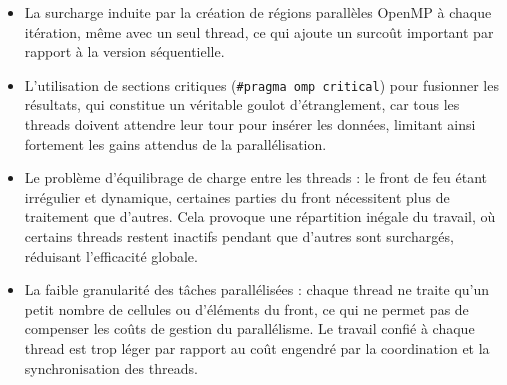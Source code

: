 \documentclass[a4paper,12pt]{article}
\begin{document}
\begin{itemize}
    \item La surcharge induite par la création de régions parallèles OpenMP à chaque itération, même avec un seul thread, ce qui ajoute un surcoût important par rapport à la version séquentielle.
    
    \item L'utilisation de sections critiques (\verb|#pragma omp critical|) pour fusionner les résultats, qui constitue un véritable goulot d'étranglement, car tous les threads doivent attendre leur tour pour insérer les données, limitant ainsi fortement les gains attendus de la parallélisation.
    
    \item Le problème d'équilibrage de charge entre les threads : le front de feu étant irrégulier et dynamique, certaines parties du front nécessitent plus de traitement que d'autres. Cela provoque une répartition inégale du travail, où certains threads restent inactifs pendant que d'autres sont surchargés, réduisant l'efficacité globale.
    
    \item La faible granularité des tâches parallélisées : chaque thread ne traite qu'un petit nombre de cellules ou d'éléments du front, ce qui ne permet pas de compenser les coûts de gestion du parallélisme. Le travail confié à chaque thread est trop léger par rapport au coût engendré par la coordination et la synchronisation des threads.
\end{itemize}
\end{document}
